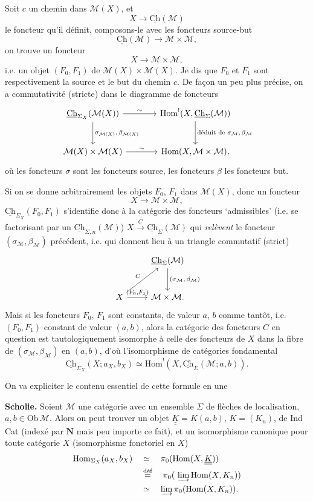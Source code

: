 \documentclass[11pt]{article}
\newcommand{\printedpage}[1]{\marginpar{\footnotesize p.~#1}}
\newcommand{\msp}[1]{\marginpar{\footnotesize [#1]}}
\newcommand{\Hom}{\mathrm{Hom}}
\newcommand{\Ch}{\underline{\mathrm{Ch}}}
\newcommand{\cM}{\mathcal{M}}
\newcommand{\KK}{\underline{\underline{K}}}
\newcommand{\dfeq}{\overset{\text{déf}}{=}}
\begin{document}
\msp{page 31}
Soit $c$ un chemin dans $\cM(X)$, et
\[
X\longrightarrow\Ch(\cM)
\]
le foncteur qu'il définit, composons-le avec les foncteurs source-but
\[
\Ch(\cM)\longrightarrow\cM\times\cM,
\]
on trouve un foncteur
\[
X\longrightarrow\cM\times\cM,
\]
i.e. un objet $(F_0,F_1)$ de $\cM(X)\times\cM(X)$. Je dis que $F_0$ et $F_1$ sont respectivement la source et le but du chemin $c$. De façon un peu plus précise, on a commutativité (stricte) dans le diagramme de foncteurs
\printedpage{20}
\[
\begin{tikzcd}[column sep=large, row sep=large]
\Ch_{\Sigma_X}(\cM(X)) \arrow[r, "\sim"] \arrow[d, "{\sigma_{\cM(X)},\,\beta_{\cM(X)}}"] & \Hom^{!}(X,\Ch_{\Sigma}(\cM)) \arrow[d, "{\text{déduit de }\sigma_{\cM},\,\beta_{\cM}}"] \\
\cM(X)\times\cM(X) \arrow[r, "\sim"] & \Hom(X,\cM\times\cM),
\end{tikzcd}
\]
où les foncteurs $\sigma$ sont les foncteurs source, les foncteurs $\beta$ les foncteurs but.

Si on se donne arbitrairement les objets $F_0$, $F_1$ dans $\cM(X)$, donc un foncteur
\[
X\longrightarrow\cM\times\cM,
\]
$\Ch_{\Sigma_X}(F_0,F_1)$ s'identifie donc à la catégorie des foncteurs ‘admissibles’ (i.e. se factorisant par un $\Ch_{\Sigma,n}(\cM)$) $X\xrightarrow{\ C\ }\Ch_{\Sigma}(\cM)$ qui \textit{relèvent}
\msp{page 32: blank}
\msp{page 33}
le foncteur $(\sigma_{\cM},\beta_{\cM})$ précédent, i.e. qui donnent lieu à un triangle commutatif (strict)
\[
\begin{tikzcd}[row sep=large]
 & \Ch_{\Sigma}(\cM) \arrow[d, "{(\sigma_{\cM},\,\beta_{\cM})}"] \\
X \arrow[ur, "C"] \arrow[r, "{(F_0,F_1)}"] & \cM\times\cM.
\end{tikzcd}
\]
Mais si les foncteurs $F_0$, $F_1$ sont constants, de valeur $a$, $b$ comme tantôt, i.e. $(F_0,F_1)$ constant de valeur $(a,b)$, alors la catégorie des foncteurs $C$ en question est tautologiquement isomorphe à celle des foncteurs de $X$ dans la fibre de $(\sigma_{\cM},\beta_{\cM})$ en $(a,b)$, d'où l'isomorphisme de catégories fondamental
\[
\boxed{\Ch_{\Sigma_X}(X;a_X,b_X)\simeq\Hom^{!}(X,\Ch_{\Sigma}(\cM;a,b)).}
\]

On va expliciter le contenu essentiel de cette formule en une

\textbf{Scholie.} Soient $\cM$ une catégorie avec un ensemble $\Sigma$ de flèches de localisation, $a,b\in\mathrm{Ob}\,\cM$. Alors on peut trouver un objet $\KK=K(a,b)$, $K=(K_n)$, de Ind\,Cat (indexé par $\mathbf{N}$ mais peu importe ce fait), et un isomorphisme canonique pour toute catégorie $X$ (isomorphisme fonctoriel en $X$)
\[
\begin{aligned}
\mathrm{Hom}_{\Sigma_X}(a_X,b_X) \quad &\simeq \quad \pi_0(\Hom(X,\KK)) \\
&\dfeq \quad \pi_0(\ \varinjlim \Hom(X,K_n)) \\
&\simeq \quad \varinjlim \pi_0(\Hom(X,K_n)).
\end{aligned}
\]
\end{document}
